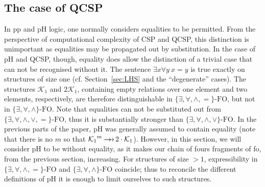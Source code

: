 \documentclass{LMCS}
\newcommand{\qcsplogic}{\ensuremath{\{\exists, \forall, \wedge \}
    \mbox{-}\mathrm{FO}}}
\newcommand{\qcsplogiceq}{\ensuremath{\{\exists, \forall, \wedge,= \} \mbox{-}\mathrm{FO}}}
\newcommand{\mylogic}{\ensuremath{\{\exists, \forall, \wedge,\vee \} \mbox{-}\mathrm{FO}}}
\newcommand{\posFO}{\ensuremath{\{\exists, \forall, \wedge,\vee,= \}
    \mbox{-}\mathrm{FO}}}
\newcommand{\surhom}{
  \ensuremath{
      \negthinspace 
      \longrightarrow
      \hspace{-5mm} \rightarrow \hspace{1mm}
  }
}
\begin{document}
\subsection{The case of QCSP}
\label{sec:qcsp}

In pp and pH logic, one normally considers
equalities to be permitted. From the perspective of computational
complexity of CSP and QCSP, this distinction is unimportant as
equalities may be propagated out by substitution. In the case of
pH and QCSP, though, equality does allow the distinction of
a trivial case that can not be recognised without it. The sentence
$\exists x \forall y \ x=y$ is true exactly on structures of size one (\mbox{cf.} Section~\ref{sec:LHS} and the ``degenerate'' cases). The structures $\mathcal{K}_1$ and $2 \mathcal{K}_1$, containing empty relations over one element and two elements, respectively, are therefore distinguishable in $\qcsplogiceq$, but not in $\qcsplogic$. Note that equalities can not be substituted out from $\posFO$, thus it is substantially stronger than $\mylogic$. In the previous parts of the paper, pH was generally assumed to contain equality (note that there is no $m$ so that ${\mathcal{K}_1}^m \surhom 2\cdot \mathcal{K}_1$). However, in this section, we will consider pH to be without equality, as it makes our chain of fours fragments of fo, from the previous section, increasing. For structures of size $>1$, expressibility in $\qcsplogiceq$ and $\qcsplogic$ coincide; thus to reconcile the different definitions of pH it is enough to limit ourselves to such structures. 
\end{document}
